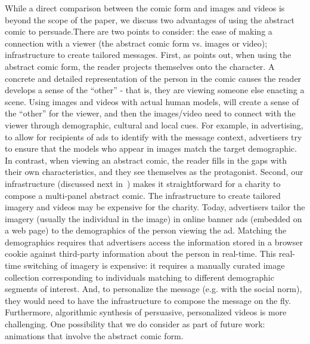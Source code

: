 \begin{description} [leftmargin=\parindent,topsep=0pt,partopsep=3pt,parsep=0pt,itemsep=3pt, listparindent=\parindent]
    \item[Other Media Forms:] While a direct comparison between the comic form and images and videos is beyond the scope of the paper, we discuss two advantages of using the abstract comic to persuade.There are two points to consider: the ease of making a connection with a viewer (the abstract comic form vs. images or video); infrastructure to create tailored messages. First, as \textcite{mccloud2011making} points out, when using the abstract comic form, the reader projects themselves onto the character. A concrete and detailed representation of the person in the comic causes the reader develops a sense of the ``other'' - that is, they are viewing someone else enacting a scene. Using images and videos with actual human models, will create a sense of the ``other'' for the viewer, and then the images/video need to connect with the viewer through demographic, cultural and local cues. For example, in advertising, to allow for recipients of ads to identify with the message context, advertisers try to ensure that the models who appear in images match the target demographic. In contrast, when viewing an abstract comic, the reader fills in the gaps with their own characteristics, and they see themselves as the protagonist. Second, our infrastructure (discussed next in~) makes it straightforward for a charity to compose a multi-panel abstract comic. The infrastructure to create tailored imagery and videos may be expensive for the charity. Today, advertisers tailor the imagery (usually the individual in the image) in online banner ads (embedded on a web page) to the demographics of the person viewing the ad. Matching the demographics requires that advertisers access the information stored in a browser cookie against third-party information about the person in real-time. This real-time switching of imagery is expensive: it requires a manually curated image collection corresponding to individuals matching to different demographic segments of interest. And, to personalize the message (e.g. with the social norm), they would need to have the infrastructure to compose the message on the fly. Furthermore, algorithmic synthesis of persuasive, personalized videos is more challenging. One possibility that we do consider as part of future work: animations that involve the abstract comic form.

\end{description}

